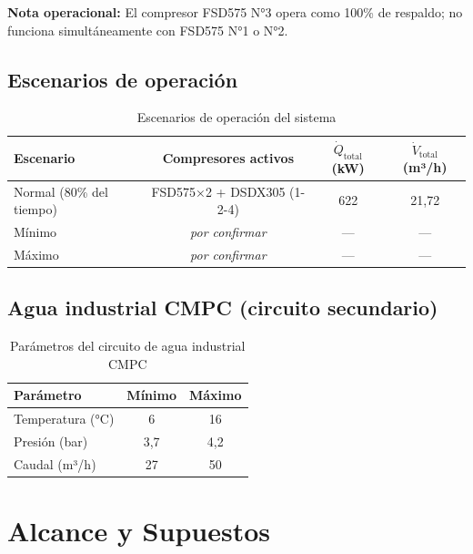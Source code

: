 \documentclass[12pt, letterpaper]{article}
\begin{document}
\noindent\textbf{Nota operacional:} El compresor FSD575 N°3 opera como 100\% de respaldo;
no funciona simultáneamente con FSD575 N°1 o N°2.

\subsection{Escenarios de operación}

\begin{table}[H]
  \centering
  \caption{Escenarios de operación del sistema}
  \label{tab:escenarios}
  \begin{tabular}{lccc}
    \toprule
    Escenario & Compresores activos & $\dot{Q}_\text{total}$ (kW) & $\dot{V}_\text{total}$ (m³/h) \\
    \midrule
    Normal (80\% del tiempo) & FSD575×2 + DSDX305 (1-2-4) & 622 & 21{,}72 \\
    Mínimo & \textit{por confirmar} & --- & --- \\
    Máximo & \textit{por confirmar} & --- & --- \\
    \bottomrule
  \end{tabular}
\end{table}

\subsection{Agua industrial CMPC (circuito secundario)}

\begin{table}[H]
  \centering
  \caption{Parámetros del circuito de agua industrial CMPC}
  \label{tab:agua_cmpc}
  \begin{tabular}{lcc}
    \toprule
    Parámetro & Mínimo & Máximo \\
    \midrule
    Temperatura (\si{\degreeCelsius}) & 6 & 16 \\
    Presión (bar) & 3{,}7 & 4{,}2 \\
    Caudal (m³/h) & 27 & 50 \\
    \bottomrule
  \end{tabular}
\end{table}

\section{Alcance y Supuestos}
\end{document}
